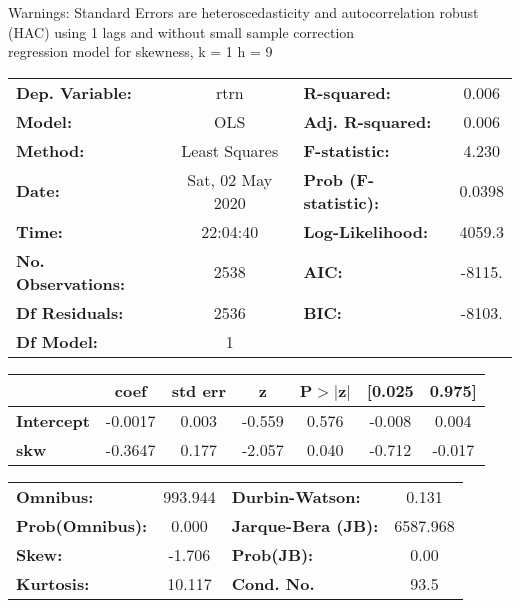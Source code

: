 Warnings: \newline
 [1] Standard Errors are heteroscedasticity and autocorrelation robust (HAC) using 1 lags and without small sample correction\\ 

regression model for skewness, k = 1 h = 9\begin{center}
\begin{tabular}{lclc}
\toprule
\textbf{Dep. Variable:}    &       rtrn       & \textbf{  R-squared:         } &     0.006   \\
\textbf{Model:}            &       OLS        & \textbf{  Adj. R-squared:    } &     0.006   \\
\textbf{Method:}           &  Least Squares   & \textbf{  F-statistic:       } &     4.230   \\
\textbf{Date:}             & Sat, 02 May 2020 & \textbf{  Prob (F-statistic):} &   0.0398    \\
\textbf{Time:}             &     22:04:40     & \textbf{  Log-Likelihood:    } &    4059.3   \\
\textbf{No. Observations:} &        2538      & \textbf{  AIC:               } &    -8115.   \\
\textbf{Df Residuals:}     &        2536      & \textbf{  BIC:               } &    -8103.   \\
\textbf{Df Model:}         &           1      & \textbf{                     } &             \\
\bottomrule
\end{tabular}
\begin{tabular}{lcccccc}
                   & \textbf{coef} & \textbf{std err} & \textbf{z} & \textbf{P$> |$z$|$} & \textbf{[0.025} & \textbf{0.975]}  \\
\midrule
\textbf{Intercept} &      -0.0017  &        0.003     &    -0.559  &         0.576        &       -0.008    &        0.004     \\
\textbf{skw}       &      -0.3647  &        0.177     &    -2.057  &         0.040        &       -0.712    &       -0.017     \\
\bottomrule
\end{tabular}
\begin{tabular}{lclc}
\textbf{Omnibus:}       & 993.944 & \textbf{  Durbin-Watson:     } &    0.131  \\
\textbf{Prob(Omnibus):} &   0.000 & \textbf{  Jarque-Bera (JB):  } & 6587.968  \\
\textbf{Skew:}          &  -1.706 & \textbf{  Prob(JB):          } &     0.00  \\
\textbf{Kurtosis:}      &  10.117 & \textbf{  Cond. No.          } &     93.5  \\
\bottomrule
\end{tabular}
\end{center}

